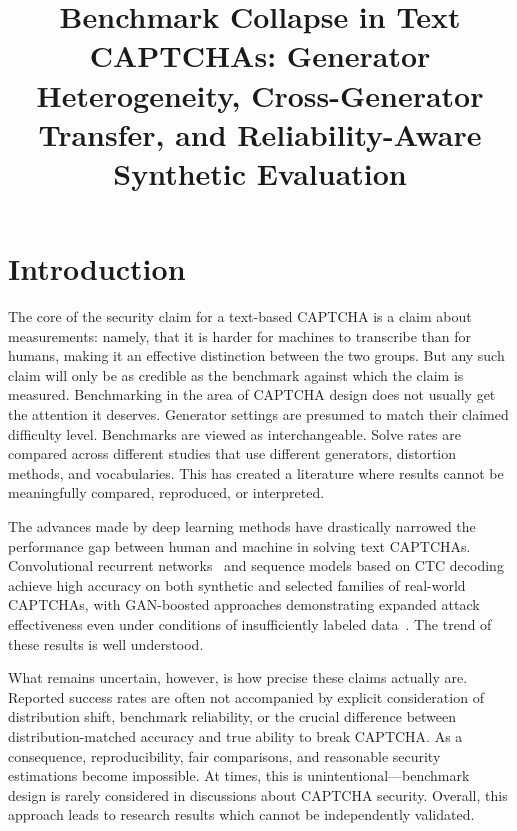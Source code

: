 \documentclass[pdflatex,sn-mathphys-num,iicol]{sn-jnl}
\title{Benchmark Collapse in Text CAPTCHAs: Generator Heterogeneity, Cross-Generator Transfer, and Reliability-Aware Synthetic Evaluation}
\author[1]{\fnm{Anonymous} \sur{Author}}
\affil[1]{\orgname{Institution withheld for peer review}, \orgaddress{\country{Anonymous}}}
\begin{document}
\maketitle


\section{Introduction}

The core of the security claim for a text-based CAPTCHA is a claim about
measurements: namely, that it is harder for machines to transcribe than for
humans, making it an effective distinction between the two groups. But any such
claim will only be as credible as the benchmark against which the claim
is measured. Benchmarking in the area of CAPTCHA design does not usually
get the attention it deserves. Generator settings are presumed to match
their claimed difficulty level. Benchmarks are viewed as interchangeable.
Solve rates are compared across different studies that use different
generators, distortion methods, and vocabularies. This has created a
literature where results cannot be meaningfully compared, reproduced, or
interpreted.

The advances made by deep learning methods have drastically narrowed the performance gap between human and machine in solving text CAPTCHAs. Convolutional recurrent networks~\cite{shi2017crnn} and sequence models based on CTC decoding~\cite{graves2006ctc} achieve high accuracy on both synthetic and selected families of real-world CAPTCHAs, with GAN-boosted approaches demonstrating expanded attack effectiveness even under conditions of insufficiently labeled data~\cite{goodfellow2014generative,ye2018captcha,li2020endtoendcaptcha,aguilar2021captcha}. The trend of these results is well understood.

What remains uncertain, however, is how precise these claims actually are. Reported success rates are often not accompanied by explicit consideration of distribution shift, benchmark reliability, or the crucial difference between distribution-matched accuracy and true ability to break CAPTCHA. As a consequence, reproducibility, fair comparisons, and reasonable security estimations become impossible. At times, this is unintentional---benchmark design is rarely considered in discussions about CAPTCHA security. Overall, this approach leads to research results which cannot be independently validated.
\end{document}
